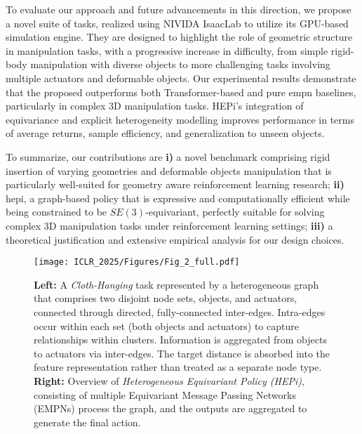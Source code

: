 To evaluate our approach and future advancements in this direction, we propose a novel suite of  tasks, realized using NIVIDA IsaacLab \citep{mittal2023orbit} to utilize its GPU-based simulation engine.
They are designed to highlight the role of geometric structure in manipulation tasks, with a progressive increase in difficulty, from simple rigid-body manipulation with diverse objects to more challenging tasks involving multiple actuators and deformable objects. Our experimental results demonstrate that the proposed \emph{\model} outperforms both Transformer-based and pure \gls{empn} baselines, particularly in complex 3D manipulation tasks. HEPi's integration of equivariance and explicit heterogeneity modelling improves performance in terms of average returns, sample efficiency,  and generalization to unseen objects.

To summarize, our contributions are \textbf{i)} a novel benchmark comprising rigid insertion of varying geometries and deformable objects manipulation that is particularly well-suited for geometry aware reinforcement learning research; \textbf{ii)} \gls{hepi}, a graph-based policy that is expressive and computationally efficient while being constrained to be $SE(3)$-equivariant, perfectly suitable for solving complex 3D manipulation tasks under reinforcement learning settings; \textbf{iii)} a theoretical justification and extensive empirical analysis for our design choices.

\begin{figure*}
    \centering
    \texttt{[image: ICLR\_2025/Figures/Fig\_2\_full.pdf]}
    \caption{\textbf{Left:} A \emph{Cloth-Hanging} task represented by a heterogeneous graph that comprises two disjoint node sets, objects, and actuators, connected through directed, fully-connected inter-edges. Intra-edges occur within each set (both objects and actuators) to capture relationships within clusters. Information is aggregated from objects to actuators via inter-edges. The target distance is absorbed into the feature representation rather than treated as a separate node type. \textbf{Right:} Overview of \emph{Heterogeneous Equivariant Policy (HEPi)}, consisting of multiple Equivariant Message Passing Networks (EMPNs) process the graph, and the outputs are aggregated to generate the final action.}
    \label{fig:hepi_diagram}
\end{figure*}
